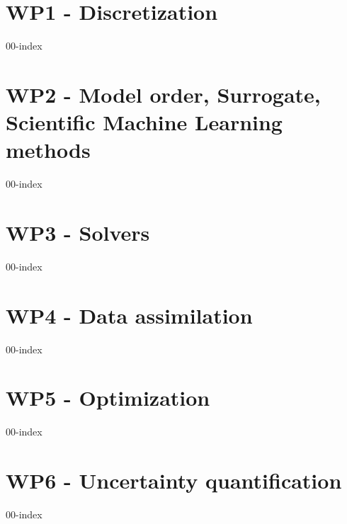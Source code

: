 \chapter{WP1 - Discretization}
\clearpage
{00-index}

\chapter{WP2 - Model order, Surrogate, Scientific Machine Learning methods}
\clearpage
{00-index}

\chapter{WP3 - Solvers}
\clearpage
{00-index}

\chapter{WP4 - Data assimilation}
\clearpage
{00-index}

\chapter{WP5 - Optimization}
\clearpage
{00-index}

\chapter{WP6 - Uncertainty quantification}
\clearpage
{00-index}

